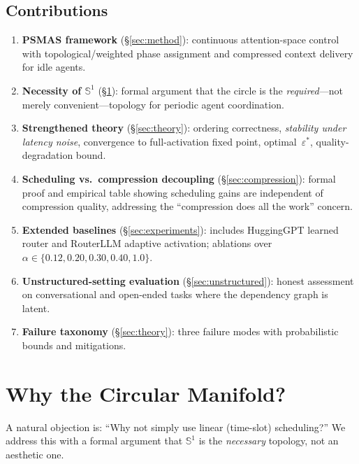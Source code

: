 \documentclass[10pt,twocolumn]{article}
\theoremstyle{plain}
\theoremstyle{definition}
\theoremstyle{remark}
\newcommand{\eps}{\varepsilon}
\newcommand{\Sone}{\mathbb{S}^1}
\begin{document}
\subsection{Contributions}
\begin{tcolorbox}[contribution={Contributions}]
\begin{enumerate}[leftmargin=1em,itemsep=0pt,topsep=1pt]
\item \textbf{PSMAS framework} (\S\ref{sec:method}): continuous
      attention-space control with topological/weighted phase
      assignment and compressed context delivery for idle agents.
\item \textbf{Necessity of $\Sone$} (\S\ref{sec:why_circular}):
      formal argument that the circle is the \emph{required}---not
      merely convenient---topology for periodic agent coordination.
\item \textbf{Strengthened theory} (\S\ref{sec:theory}):
      ordering correctness, \emph{stability under latency noise},
      convergence to full-activation fixed point, optimal~$\eps^*$,
      quality-degradation bound.
\item \textbf{Scheduling vs.\ compression decoupling}
      (\S\ref{sec:compression}): formal proof and empirical table
      showing scheduling gains are independent of compression quality,
      addressing the ``compression does all the work'' concern.
\item \textbf{Extended baselines} (\S\ref{sec:experiments}):
      includes HuggingGPT learned router and RouterLLM adaptive
      activation; ablations over $\alpha\in\{0.12,0.20,0.30,0.40,1.0\}$.
\item \textbf{Unstructured-setting evaluation}
      (\S\ref{sec:unstructured}): honest assessment on conversational
      and open-ended tasks where the dependency graph is latent.
\item \textbf{Failure taxonomy} (\S\ref{sec:theory}): three failure
      modes with probabilistic bounds and mitigations.
\end{enumerate}
\end{tcolorbox}

\section{Why the Circular Manifold?}
\label{sec:why_circular}

A natural objection is: ``Why not simply use linear (time-slot)
scheduling?''  We address this with a formal argument that $\Sone$ is
the \emph{necessary} topology, not an aesthetic one.
\end{document}
